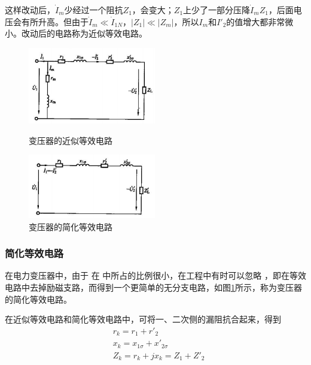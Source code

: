 \documentclass{book}
\begin{document}
这样改动后，${{\dot{I}}_{m}}$少经过一个阻抗${{{Z}}_{1}}$，会变大；${{{Z}}_{1}}$上少了一部分压降${{\dot{I}}_{m}}{{Z}_{1}}$，后面电压会有所升高。但由于${{\dot{I}}_{m}}\ll {{\dot{I}}_{1N}}$，$\left| {{Z}_{1}} \right|\ll \left| {{Z}_{m}} \right|$，所以${{{I}}_{m}}$和${{{I}'}_{2}}$的值增大都非常微小。改动后的电路称为近似等效电路。
\begin{figure}  %
	\begin{minipage}[H]{0.45\linewidth}  
		\centering  
		\includegraphics[width=2.2in]{3-13.png}  
		\caption{变压器的近似等效电路}
		\label{fig:3.13} 
	\end{minipage}
	\begin{minipage}[H]{0.45\linewidth}  
		\centering  
		\includegraphics[width=2.2in]{3-14.png}  
		\caption{变压器的简化等效电路} 
		\label{fig:3.14} 
	\end{minipage}
\end{figure}
\subsubsection{简化等效电路}
在电力变压器中，由于 在 中所占的比例很小，在工程中有时可以忽略 ，即在等效电路中去掉励磁支路，而得到一个更简单的无分支电路，如图\ref{fig:3.14}所示，称为变压器的简化等效电路。

在近似等效电路和简化等效电路中，可将一、二次侧的漏阻抗合起来，得到
\begin{equation}
\begin{aligned}
& {{r}_{k}}={{r}_{1}}+{{{{r}'}}_{2}} \\ 
& {{x}_{k}}={{x}_{1\sigma }}+{{{{x}'}}_{2\sigma }} \\ 
& {{Z}_{k}}={{r}_{k}}+j{{x}_{k}}={{Z}_{1}}+{{{{Z}'}}_{2}} 
\end{aligned}
\label{2-37}
\end{equation}
\end{document}
